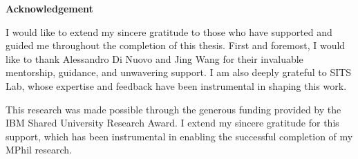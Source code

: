 \textbf{Acknowledgement} 

I would like to extend my sincere gratitude to those who have supported and guided me throughout the completion of this thesis. First and foremost, I would like to thank Alessandro Di Nuovo and Jing Wang for their invaluable mentorship, guidance, and unwavering support. I am also deeply grateful to SITS Lab, whose expertise and feedback have been instrumental in shaping this work.

This research was made possible through the generous funding provided by the IBM Shared University Research Award. I extend my sincere gratitude for this support, which has been instrumental in enabling the successful completion of my MPhil research.